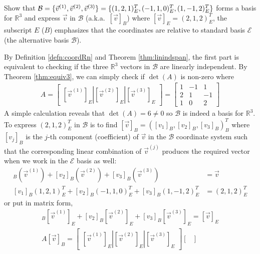 \begin{exmp}
\label{exmp:basisR3}
Show that $\mathcal{B} = \{\vec{v}^{(1)}, \vec{v}^{(2)}, \vec{v}^{(3)}\} = \{(1,2,1)_E^T, (-1,1,0)_E^T, \\ (1,-1,2)_E^T\}$ forms a basis for $\mathbb{R}^3$ and express $\vec{v}$ in $\mathcal{B}$ (a.k.a.\ $[\vec{v}]_B$) where $[\vec{v}]_E = (2,1,2)_E^T$, the subscript $E$ ($B$) emphasizes that the coordinates are relative to standard basis $\mathcal{E}$ (the alternative basis $\mathcal{B}$).
\end{exmp}
\begin{solution}
By Definition \ref{defn:coordRn} and Theorem \ref{thm:linindspan}, the first part is equivalent to checking if the three $\mathbb{R}^3$ vectors in $\mathcal{B}$ are linearly independent. By Theorem \ref{thm:equiv3}, we can simply check if $\det(A)$ is non-zero where 
\begin{align*}
A = \begin{bmatrix}[\vec{v}^{(1)}]_E|[\vec{v}^{(2)}]_E|[\vec{v}^{(3)}]_E
\end{bmatrix} =
\begin{bmatrix}
1 & -1 & 1 \\
2 & 1 & -1 \\
1 & 0 & 2
\end{bmatrix}
\end{align*}
A simple calculation reveals that $\det(A) = 6 \neq 0$ so $\mathcal{B}$ is indeed a basis for $\mathbb{R}^3$. To express $(2,1,2)_E^T$ in $\mathcal{B}$ is to find $[\vec{v}]_B = ([v_1]_B, [v_2]_B, [v_3]_B)_B^T$ where $[v_j]_B$ is the $j$-th component (coefficient) of $\vec{v}$ in the $\mathcal{B}$ coordinate system such that the corresponding linear combination of $\vec{v}^{(j)}$ produces the required vector when we work in the $\mathcal{E}$ basis as well:
\begin{align*}
[v_1]_B(\vec{v}^{(1)}) + [v_2]_B(\vec{v}^{(2)}) + [v_3]_B(\vec{v}^{(3)}) &= \vec{v} \\
[v_1]_B(1,2,1)_E^T + [v_2]_B(-1,1,0)_E^T + [v_3]_B(1,-1,2)_E^T &= (2,1,2)_E^T \end{align*}
or put in matrix form,
\begin{align*}
[v_1]_B[\vec{v}^{(1)}]_E + [v_2]_B[\vec{v}^{(2)}]_E + [v_3]_B[\vec{v}^{(3)}]_E = [\vec{v}]_E \\
A[\vec{v}]_B = \begin{bmatrix}[\vec{v}^{(1)}]_E|[\vec{v}^{(2)}]_E|[\vec{v}^{(3)}]_E
\end{bmatrix}\begin{bmatrix}

\end{bmatrix}
\end{align*}
\end{solution}
